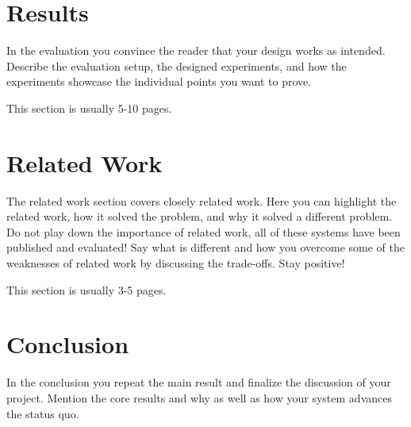 \documentclass[a4paper,11pt,oneside]{report}
\begin{document}
\chapter{Results}

In the evaluation you convince the reader that your design works as intended.
Describe the evaluation setup, the designed experiments, and how the
experiments showcase the individual points you want to prove.

This section is usually 5-10 pages.


\chapter{Related Work}

The related work section covers closely related work. Here you can highlight
the related work, how it solved the problem, and why it solved a different
problem. Do not play down the importance of related work, all of these
systems have been published and evaluated! Say what is different and how
you overcome some of the weaknesses of related work by discussing the 
trade-offs. Stay positive!

This section is usually 3-5 pages.


\chapter{Conclusion}

In the conclusion you repeat the main result and finalize the discussion of
your project. Mention the core results and why as well as how your system
advances the status quo.

\cleardoublepage
{}
{}
\printbibliography

%
%
\end{document}
